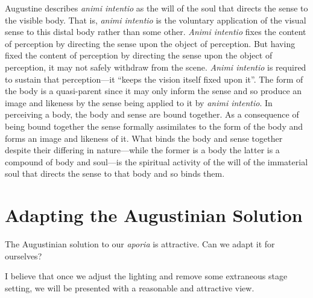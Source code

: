 \documentclass[12pt]{article}
\begin{document}
Augustine describes \emph{animi intentio} as the will of the soul that directs the sense to the visible body. That is, \emph{animi intentio} is the voluntary application of the visual sense to this distal body rather than some other. \emph{Animi intentio} fixes the content of perception by directing the sense upon the object of perception. But having fixed the content of perception by directing the sense upon the object of perception, it may not safely withdraw from the scene. \emph{Animi intentio} is required to sustain that perception---it ``keeps the vision itself fixed upon it''. The form of the body is a quasi-parent since it may only inform the sense and so produce an image and likeness by the sense being applied to it by \emph{animi intentio}. In perceiving a body, the body and sense are bound together. As a consequence of being bound together the sense formally assimilates to the form of the body and forms an image and likeness of it. What binds the body and sense together despite their differing in nature---while the former is a body the latter is a compound of body and soul---is the spiritual activity of the will of the immaterial soul that directs the sense to that body and so binds them.


\section{Adapting the Augustinian Solution} %
\label{sec:adapting_the_augustinian_solution}

The Augustinian solution to our \emph{aporia} is attractive. Can we adapt it for ourselves?

I believe that once we adjust the lighting and remove some extraneous stage setting, we will be presented with a reasonable and attractive view. 



\nocite{Broadie:1993dz}
\nocite{Hicks:1907uq}



\end{document}
